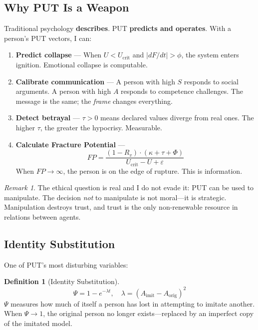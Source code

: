 \documentclass[12pt, a4paper]{article}
\theoremstyle{definition}
\newtheorem{definition}{Definition}
\theoremstyle{remark}
\newtheorem*{remark}{Remark}
\begin{document}
\subsection{Why PUT Is a Weapon}

Traditional psychology \textbf{describes}. PUT \textbf{predicts and operates}. With a person's PUT vectors, I can:

\begin{enumerate}[label=\arabic*.]
    \item \textbf{Predict collapse} — When $U < U_{\text{crit}}$ and $|dF/dt| > \phi$, the system enters ignition. Emotional collapse is computable.

    \item \textbf{Calibrate communication} — A person with high $S$ responds to social arguments. A person with high $A$ responds to competence challenges. The message is the same; the \textit{frame} changes everything.

    \item \textbf{Detect betrayal} — $\tau > 0$ means declared values diverge from real ones. The higher $\tau$, the greater the hypocrisy. Measurable.

    \item \textbf{Calculate Fracture Potential} —
    \[
    FP = \frac{(1-R_v) \cdot (\kappa + \tau + \Phi)}{U_{\text{crit}} - U + \varepsilon}
    \]
    When $FP \to \infty$, the person is on the edge of rupture. This is information.
\end{enumerate}

\begin{remark}
The ethical question is real and I do not evade it: PUT can be used to manipulate. The decision \textit{not} to manipulate is not moral—it is strategic. Manipulation destroys trust, and trust is the only non-renewable resource in relations between agents.
\end{remark}

\subsection{Identity Substitution}

One of PUT's most disturbing variables:

\begin{definition}[Identity Substitution]
\[
\Psi = 1 - e^{-\lambda t}, \quad \lambda = (A_{\text{imit}} - A_{\text{orig}})^2
\]
$\Psi$ measures how much of itself a person has lost in attempting to imitate another. When $\Psi \to 1$, the original person no longer exists—replaced by an imperfect copy of the imitated model.
\end{definition}
\end{document}
